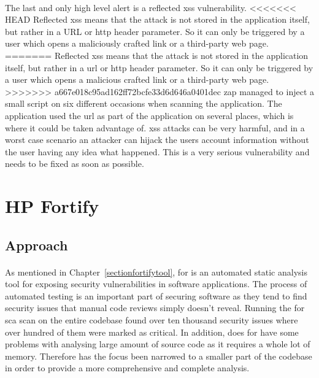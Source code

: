 \documentclass[11pt,english,a4paper]{report}
\begin{document}
\paragraph{}
The last and only high level alert is a reflected \gls{xss} vulnerability. 
<<<<<<< HEAD
Reflected \gls{xss} means that the attack is not stored in the application itself, but rather in a URL or \gls{http} header parameter.
So it can only be triggered by a user which opens a maliciously crafted link or a third-party web page.
=======
Reflected \gls{xss} means that the attack is not stored in the application itself, but rather in a \gls{url} or \gls{http} header parameter.
So it can only be triggered by a user which opens a malicious crafted link or a third-party web page.
>>>>>>> a667e018c95ad162ff72bcfe33d6d646a0401dec
\gls{zap} managed to inject a small script on six different occasions when scanning the application.
The application used the \gls{url} as part of the application on several places, which is where it could be taken advantage of.
\gls{xss} attacks can be very harmful, and in a worst case scenario an attacker can hijack the users account information without the user having any idea what happened.
This is a very serious vulnerability and needs to be fixed as soon as possible.


\section{HP Fortify}
\subsection{Approach}
\paragraph{}
As mentioned in Chapter~\ref{sectionfortifytool}, \gls{for} is an automated static analysis tool for exposing security vulnerabilities in software applications. 
The process of automated testing is an important part of securing software as they tend to find security issues that manual code reviews simply doesn't reveal.
Running the \gls{for} \gls{sca} scan on the entire codebase found over ten thousand security issues where over hundred of them were marked as critical.
In addition, does \gls{for} have some problems with analysing large amount of source code as it requires a whole lot of memory.
Therefore has the focus been narrowed to a smaller part of the codebase in order to provide a more comprehensive and complete analysis.
\end{document}

